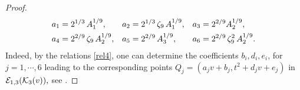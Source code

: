 \documentclass[11pt]{amsart}
\begin{document}
\begin{proof}
	
		\begin{align*}
		a_1& =  2^{1/3} \, A_1^{1/9}, & 
		a_2& =  2^{1/3} \, \zeta_9 \, A_1^{1/9}, & 	a_3 &=   2^{2/9} A_2^{1/9},\notag \\
		a_4& =  2^{2/9}\,  \zeta_9 \,  A_2^{1/9},& 
		a_5 &=2^{2/9}\, A_3^{1/9}, &  	a_6&=    2^{2/9} \, \zeta_9^2  \, A_2^{1/9}.	
	\end{align*}
% 
	Indeed, by the relations \eqref{rel4}, one can determine the coefficients $b_i, d_i, e_i$, for $j=1,\cdots, 6$ leading to the 
	corresponding points $Q_j=(a_j v+ b_j, t^2 + d_j v + e_j)$ in ${\mathcal E}_{1,3}({\mathcal K}_3(v)),$ 
	see \cite[Points3]{Shioda360-Codes}.
	

\end{proof}
\end{document}
